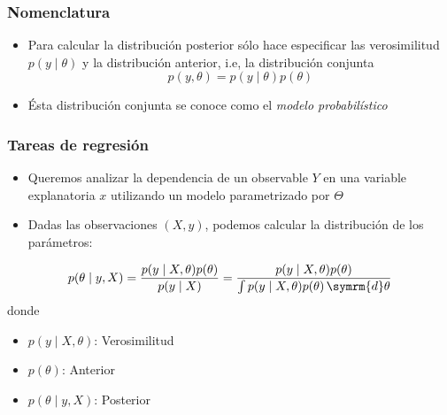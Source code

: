 \documentclass[xcolor=dvipsnames,10pt]{beamer}
\begin{document}
%
\begin{frame}
  \frametitle{Nomenclatura}
  \begin{itemize}
  \item Para calcular la distribución posterior sólo hace especificar las verosimilitud $p(y \mid \theta)$ y la distribución anterior, i.e, la distribución conjunta
    \begin{equation*}
      p(y, \theta) = p(y \mid \theta) p(\theta)
    \end{equation*}
  \item Ésta distribución conjunta se conoce como el \emph{modelo probabilístico}
  \end{itemize}
\end{frame}
%
\begin{frame}
  \frametitle{Tareas de regresión}
  \begin{itemize}
  \item Queremos analizar la dependencia de un observable $Y$ en una variable explanatoria $x$ utilizando un modelo parametrizado por $\Theta$
  \item Dadas las observaciones $(X, y)$, podemos calcular la distribución de los parámetros:
  \end{itemize}
  \begin{equation*}
    p(\theta \mid y, X) = \frac{p(y \mid X, \theta) p(\theta)}{p(y \mid X)} = \frac{p(y \mid X, \theta) p(\theta)}{\int p(y \mid X, \theta) p(\theta) \, \symrm{d} \theta}
  \end{equation*}
  donde
  \begin{itemize}
  \item $p(y \mid X, \theta)$: Verosimilitud
  \item $p(\theta)$: Anterior
  \item $p(\theta \mid y, X)$: Posterior
  \end{itemize}
\end{frame}
%
\begin{frame}
  \pythonframe
\end{frame}
%
\end{document}
